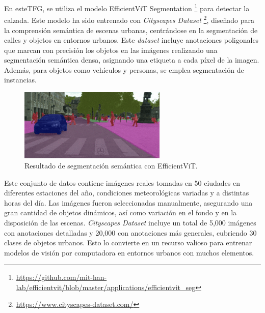 En este\ac{TFG}, se utiliza el modelo EfficientViT Segmentation \footnote{\url{ https://github.com/mit-han-lab/efficientvit/blob/master/applications/efficientvit_seg}}  para detectar la calzada. Este modelo ha sido entrenado con \textit{Cityscapes Dataset} \footnote{\url{https://www.cityscapes-dataset.com/}}, diseñado para la comprensión semántica de escenas urbanas, centrándose en la segmentación de calles y objetos en entornos urbanos. Este \textit{dataset} incluye anotaciones poligonales que marcan con precisión los objetos en las imágenes realizando una segmentación semántica densa, asignando una etiqueta a cada píxel de la imagen. Además, para objetos como vehículos y personas, se emplea segmentación de instancias.

\begin{figure}[ht]
  \begin{center}
    \includegraphics[width=7cm]{figs/Plataformas_Desarollo/resultado_ef.png}
  \end{center}
  \caption{Resultado de segmentación semántica con EfficientViT.}
  \label{foto_ef}
\end{figure}

Este conjunto de datos contiene imágenes reales tomadas en 50 ciudades en diferentes estaciones del año, condiciones meteorológicas variadas y a distintas horas del día. Las imágenes fueron seleccionadas manualmente, asegurando una gran cantidad de objetos dinámicos, así como variación en el fondo y en la disposición de las escenas. \textit{Cityscapes Dataset} incluye un total de 5,000 imágenes con anotaciones detalladas y 20,000 con anotaciones más generales, cubriendo 30 clases de objetos urbanos. Esto lo convierte en un recurso valioso para entrenar modelos de visión por computadora en entornos urbanos con muchos elementos.
 
